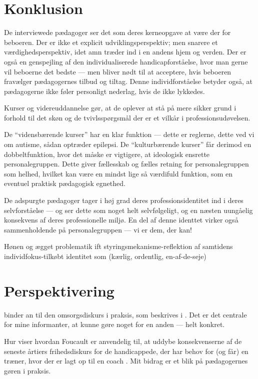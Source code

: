 \section{Konklusion}
De interviewede pædagoger ser det som deres kerneopgave at være der for beboeren.
Der er ikke et explicit udviklingsperspektiv; men snarere et værdighedsperspektiv, idet amn træder ind i en andens hjem og verden.
Der er også en genspejling af den individualiserede handicapforståelse, hvor man gerne vil beboerne det bedste — men bliver nødt til at acceptere, hvis beboeren fravælger pædagogernes tilbud og tiltag.
Denne individforståelse betyder også, at pædagogerne ikke føler personligt nederlag, hvis de ikke lykkedes.

Kurser og videreuddannelse gør, at de oplever at stå på mere sikker grund i forhold til det skøn og de tvivlsspørgsmål der er et vilkår i professionsudøvelsen.

De “vidensbærende kurser” har en klar funktion — dette er reglerne, dette ved vi om autisme, sådan optræder epilepsi.
De “kulturbærende kurser” får derimod en dobbeltfunktion, hvor det måske er vigtigere, at ideologisk ensrette personalegruppen.
Dette giver fællesskab og fælles retning for personalegruppen som helhed, hvilket kan være en mindst lige så værdifuld funktion, som en eventuel praktisk pædagogisk egnethed.

De adspurgte pædagoger tager i høj grad deres professionsidentitet ind i deres selvforståelse — og ser dette som noget helt selvfølgeligt, og en næsten uungåelig konsekvens af deres professionelle miljø.
En del af denne identtet virker også sammenholdende på personalegruppen — vi er dem, der kan!

Hønen og ægget problematik ift styringsmekanisme-reflektion af samtidens individfokus-tilkøbt identitet som (kærlig, ordentlig, en-af-de-seje)

\section{Perspektivering}
binder an til den omsorgsdiskurs i praksis, som beskrives i .
Det er det centrale for mine informanter, at kunne gøre noget for en anden — helt konkret.

Hur viser hvordan Foucault er anvendelig til, at uddybe konsekvenserne af de seneste årtiers frihedsdiskurs for de handicappede, der har behov for (og får) en træner, hvor der er lagt op til en coach \autocite{hurFrigorelsensMagt2015}.
Mit bidrag er et blik på pædagogernes gøren i praksis.

